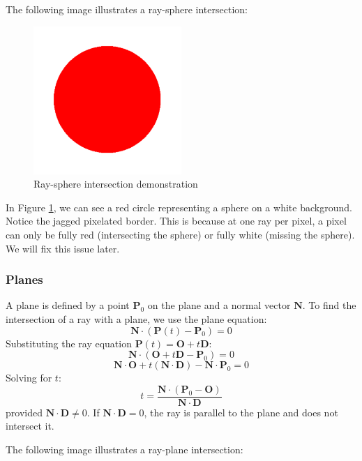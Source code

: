 \documentclass[12pt]{article}
\begin{document}
The following image illustrates a ray-sphere intersection:

\begin{figure}[H]
    \centering
    \includegraphics[width=0.5\textwidth]{images/intersections/ray_sphere_intersection.png}
    \caption{Ray-sphere intersection demonstration}
    \label{fig:raysphereintersection}
\end{figure}

In Figure \ref{fig:raysphereintersection}, we can see a red circle representing a sphere on a white background. Notice the jagged pixelated border. This is because at one ray per pixel, a pixel can only be fully red (intersecting the sphere) or fully white (missing the sphere). We will fix this issue later.

\subsubsection{Planes}

A plane is defined by a point \(\mathbf{P}_0\) on the plane and a normal vector \(\mathbf{N}\). To find the intersection of a ray with a plane, we use the plane equation:
\[
    \mathbf{N} \cdot \left( \mathbf{P}(t) - \mathbf{P}_0 \right) = 0
\]
Substituting the ray equation \(\mathbf{P}(t) = \mathbf{O} + t\mathbf{D}\):
\[
    \mathbf{N} \cdot \left( \mathbf{O} + t\mathbf{D} - \mathbf{P}_0 \right) = 0
\]
\[
    \mathbf{N} \cdot \mathbf{O} + t \left( \mathbf{N} \cdot \mathbf{D} \right) - \mathbf{N} \cdot \mathbf{P}_0 = 0
\]
Solving for \(t\):
\[
    t = \frac{\mathbf{N} \cdot (\mathbf{P}_0 - \mathbf{O})}{\mathbf{N} \cdot \mathbf{D}}
\]
provided \(\mathbf{N} \cdot \mathbf{D} \neq 0\). If \(\mathbf{N} \cdot \mathbf{D} = 0\), the ray is parallel to the plane and does not intersect it.

The following image illustrates a ray-plane intersection:
\end{document}
